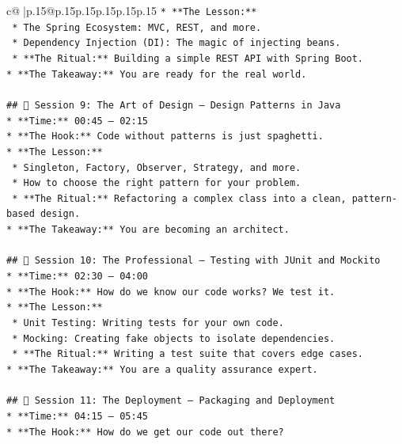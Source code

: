 \documentclass{article}
\begin{document}
{\begin{supertabular}{c@{$\;$}|p{.15\linewidth}@{}p{.15\linewidth}p{.15\linewidth}p{.15\linewidth}p{.15\linewidth}p{.15\linewidth}}
{{{\texttt{*   **The Lesson:**} \\
\texttt{    *   The Spring Ecosystem: MVC, REST, and more.} \\
\texttt{    *   Dependency Injection (DI): The magic of injecting beans.} \\
\texttt{    *   **The Ritual:** Building a simple REST API with Spring Boot.} \\
\texttt{*   **The Takeaway:** You are ready for the real world.} \\
\\ 
\texttt{\#\# 📅 Session 9: The Art of Design – Design Patterns in Java} \\
\texttt{*   **Time:** 00:45 – 02:15} \\
\texttt{*   **The Hook:** Code without patterns is just spaghetti.} \\
\texttt{*   **The Lesson:**} \\
\texttt{    *   Singleton, Factory, Observer, Strategy, and more.} \\
\texttt{    *   How to choose the right pattern for your problem.} \\
\texttt{    *   **The Ritual:** Refactoring a complex class into a clean, pattern{-}based design.} \\
\texttt{*   **The Takeaway:** You are becoming an architect.} \\
\\ 
\texttt{\#\# 📅 Session 10: The Professional – Testing with JUnit and Mockito} \\
\texttt{*   **Time:** 02:30 – 04:00} \\
\texttt{*   **The Hook:** How do we know our code works? We test it.} \\
\texttt{*   **The Lesson:**} \\
\texttt{    *   Unit Testing: Writing tests for your own code.} \\
\texttt{    *   Mocking: Creating fake objects to isolate dependencies.} \\
\texttt{    *   **The Ritual:** Writing a test suite that covers edge cases.} \\
\texttt{*   **The Takeaway:** You are a quality assurance expert.} \\
\\ 
\texttt{\#\# 📅 Session 11: The Deployment – Packaging and Deployment} \\
\texttt{*   **Time:** 04:15 – 05:45} \\
\texttt{*   **The Hook:** How do we get our code out there?} \\
}}}
\end{supertabular}}
\end{document}
